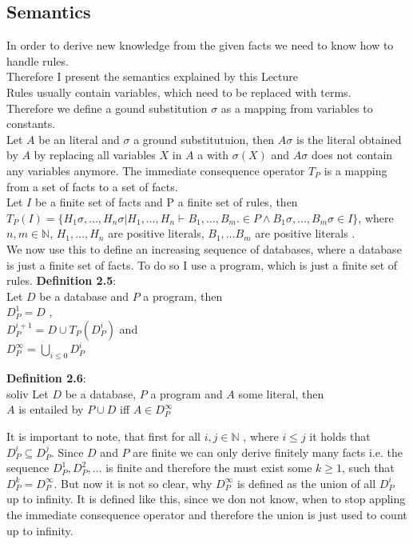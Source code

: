 \documentclass[hyperref, bachelorofscience]{cgvpub}
\renewenvironment{shaded}{%
  \def\FrameCommand{\fboxsep=\FrameSep \colorbox{shadecolor}}%
  \MakeFramed{\advance\hsize-\width \FrameRestore\FrameRestore}}%
 {\endMakeFramed}
\begin{document}
\subsection{Semantics}
In order to derive new knowledge from the given facts we need to know how to handle rules.\\
Therefore I present the semantics explained by this Lecture \cite{K2019}\\
Rules usually contain variables, which need to be replaced with terms.\\ 
Therefore we define a gound substitution $\sigma$ as a mapping from variables to constants. \\
Let $A$ be an literal and $\sigma$ a ground substitutuion, then $A\sigma$ is the literal obtained by $A$ by replacing all variables $X$ in $A$ a with $\sigma(X)$ and $A\sigma$ does not contain any variables anymore.
The immediate consequence operator $T_P$ is a mapping from a set of facts to a set of facts. \\
Let $I$ be a finite set of facts and P a finite set of rules, then \\
 $T_P(I) = \{H_1\sigma,\dots,H_n\sigma | H_1,\dots,H_n \vdash B_1,\dots , B_m . \in P \land B_1\sigma, ... , B_m\sigma \in I \}$, where $n, m \in \mathbb{N}$, $H_1,\dots,H_n $ are positive literals, $B_1,\dots B_m$ are positive literals   . \\
We now use this to define an increasing sequence of databases, where a database is just a finite set of facts. To do so I use a program, which is just a finite set of rules.
\begin{shaded}
\textbf{Definition 2.5}: \\
Let $D$ be a database and $P$ a program, then \\
 $D^1_P = D$ ,\\
 $D^{i+1}_P = D \cup T_P(D^i_P)$ and \\
 $D^{\infty}_P = \bigcup_{i \leq 0} D^i_P$\\
\end{shaded}

\begin{shaded}
\textbf{Definition 2.6}: \\soliv
Let $D$ be a database, $P$ a program and $A$ some literal, then \\
 $A$ is entailed by $P \cup D$ iff $A \in D^{\infty}_P$ \\
\end{shaded}

It is important to note, that first for all $i,j \in \mathbb{N}$ , where $i \leq j$ it holds that $D^i_P \subseteq D^j_P$. Since $D$ and $P$ are finite we can only derive finitely many facts i.e. the sequence $D^1_P, D^2_P,\dots$ is finite and therefore the must exist some $k \geq 1$, such that $D^k_P = D^{\infty}_P$.
But now it is not so clear, why $D^{\infty}_P$ is defined as the union of all $D^i_P$ up to infinity. It is defined like this, since we don not know, when to stop appling the immediate consequence operator and therefore the union is just used to count up to infinity.
\end{document}
